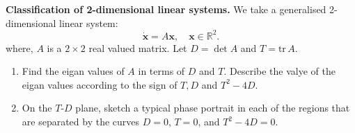 \documentclass{article}
\begin{document}
\begin{question}
\textbf{Classification of 2-dimensional linear systems.} 
We take a generalised 2-dimensional linear system:
\begin{equation}
  \dot {\bm{x}} = A\bm{x},\quad \bm{x} \in \mathbb R^2.
\end{equation}
where, $A$ is a $2\times 2$ real valued matrix. Let $D=\det A$ and $T = \text{tr}\,A$.
\begin{enumerate}[label=(\alph*)]
  \item Find the eigan values of $A$ in terms of $D$ and $T$. Describe the valye of the eigan values according to the sign of $T,D$ and $T^2-4D$.
  \item On the $T$-$D$ plane, sketch a typical phase portrait in each of the regions that are separated by the curves $D=0$, $T=0$, and $T^2-4D = 0$.
  \end{enumerate}
\end{question}
 
\end{document}
